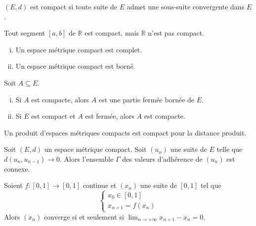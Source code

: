	\begin{theorem}
		$(E,d)$ est compact si toute suite de $E$ admet une sous-suite convergente dans $E$.
	\end{theorem}

	\begin{example}
		Tout segment $[a,b]$ de $\mathbb{R}$ est compact, mais $\mathbb{R}$ n'est pas compact.
	\end{example}

	\begin{proposition}
		\begin{enumerate}[(i)]
			\item Un espace métrique compact est complet.
			\item Un espace métrique compact est borné.
		\end{enumerate}
	\end{proposition}

	\begin{proposition}
		Soit $A \subseteq E$.
		\begin{enumerate}[(i)]
			\item Si $A$ est compacte, alors $A$ est une partie fermée bornée de $E$.
			\item Si $E$ est compact et $A$ est fermée, alors $A$ est compacte.
		\end{enumerate}
	\end{proposition}

	\begin{proposition}
		Un produit d'espaces métriques compacts est compact pour la distance produit.
	\end{proposition}


	\begin{application}
		Soit $(E, d)$ un espace métrique compact. Soit $(u_n)$ une suite de $E$ telle que $d(u_n,u_{n-1}) \longrightarrow 0$. Alors l'ensemble $\Gamma$ des valeurs d'adhérence de $(u_n)$ est connexe.
	\end{application}


	\begin{corollary}
		Soient $f : [0, 1] \rightarrow [0, 1]$ continue et $(x_n)$ une suite de $[0, 1]$ tel que
		\[ \begin{cases} x_0 \in [0, 1] \\ x_{n+1} = f(x_n) \end{cases} \]
		Alors $(x_n)$ converge si et seulement si $\lim_{n \rightarrow +\infty } x_{n+1} - x_n = 0$.
	\end{corollary}

